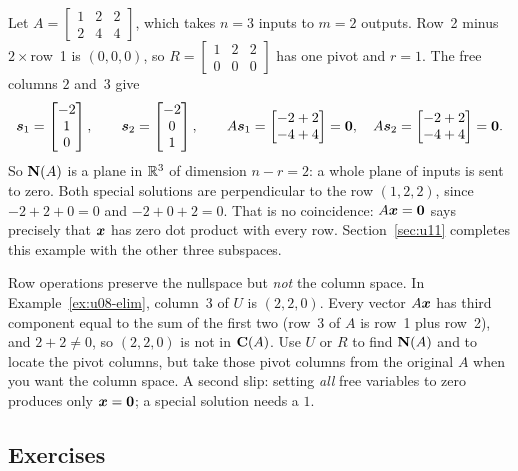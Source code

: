\begin{example}\label{ex:u08-crush}
Let $A=\begin{bmatrix}1&2&2\\2&4&4\end{bmatrix}$, which takes $n=3$ inputs to $m=2$ outputs.
Row~2 minus $2\times$row~1 is $(0,0,0)$, so $R=\begin{bmatrix}1&2&2\\0&0&0\end{bmatrix}$ has one
pivot and $r=1$. The free columns $2$ and~$3$ give
\[
\boldsymbol{s}_1=\begin{bmatrix}-2\\1\\0\end{bmatrix},\qquad \boldsymbol{s}_2=\begin{bmatrix}-2\\0\\1\end{bmatrix},
\qquad A\boldsymbol{s}_1=\begin{bmatrix}-2+2\\-4+4\end{bmatrix}=\boldsymbol{0},\quad
A\boldsymbol{s}_2=\begin{bmatrix}-2+2\\-4+4\end{bmatrix}=\boldsymbol{0}.
\]
So $\mathbf{N}(A)$ is a plane in $\mathbb{R}^3$ of dimension $n-r=2$: a whole plane of inputs is sent to
zero. Both special solutions are perpendicular to the row $(1,2,2)$, since
$-2+2+0=0$ and $-2+0+2=0$. That is no coincidence: $A\boldsymbol{x}=\boldsymbol{0}$ says precisely that
$\boldsymbol{x}$ has zero dot product with every row. Section~\ref{sec:u11} completes this example with
the other three subspaces.
\end{example}

\begin{trap}
Row operations preserve the nullspace but \emph{not} the column space. In
Example~\ref{ex:u08-elim}, column~3 of $U$ is $(2,2,0)$. Every vector $A\boldsymbol{x}$ has third component
equal to the sum of the first two (row~3 of $A$ is row~1 plus row~2), and $2+2\ne 0$, so $(2,2,0)$
is not in $\mathbf{C}(A)$. Use $U$ or $R$ to find $\mathbf{N}(A)$ and to locate the pivot columns, but take
those pivot columns from the original $A$ when you want the column space. A second slip: setting
\emph{all} free variables to zero produces only $\boldsymbol{x}=\boldsymbol{0}$; a special solution needs a $1$.
\end{trap}

\subsection{Exercises}

